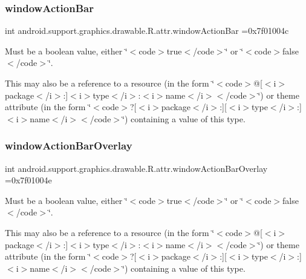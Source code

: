 \subsubsection{\texorpdfstring{window\+Action\+Bar}{windowActionBar}}
{\footnotesize\ttfamily int android.\+support.\+graphics.\+drawable.\+R.\+attr.\+window\+Action\+Bar =0x7f01004c\hspace{0.3cm}{\ttfamily [static]}}

Must be a boolean value, either \char`\"{}$<$code$>$true$<$/code$>$\char`\"{} or \char`\"{}$<$code$>$false$<$/code$>$\char`\"{}. 

This may also be a reference to a resource (in the form \char`\"{}$<$code$>$@\mbox{[}$<$i$>$package$<$/i$>$\+:\mbox{]}$<$i$>$type$<$/i$>$\+:$<$i$>$name$<$/i$>$$<$/code$>$\char`\"{}) or theme attribute (in the form \char`\"{}$<$code$>$?\mbox{[}$<$i$>$package$<$/i$>$\+:\mbox{]}\mbox{[}$<$i$>$type$<$/i$>$\+:\mbox{]}$<$i$>$name$<$/i$>$$<$/code$>$\char`\"{}) containing a value of this type. \mbox{\label{classandroid_1_1support_1_1graphics_1_1drawable_1_1R_1_1attr_ad7a0be15391a71f9e4bb290c66e13a4e}} 
\subsubsection{\texorpdfstring{window\+Action\+Bar\+Overlay}{windowActionBarOverlay}}
{\footnotesize\ttfamily int android.\+support.\+graphics.\+drawable.\+R.\+attr.\+window\+Action\+Bar\+Overlay =0x7f01004e\hspace{0.3cm}{\ttfamily [static]}}

Must be a boolean value, either \char`\"{}$<$code$>$true$<$/code$>$\char`\"{} or \char`\"{}$<$code$>$false$<$/code$>$\char`\"{}. 

This may also be a reference to a resource (in the form \char`\"{}$<$code$>$@\mbox{[}$<$i$>$package$<$/i$>$\+:\mbox{]}$<$i$>$type$<$/i$>$\+:$<$i$>$name$<$/i$>$$<$/code$>$\char`\"{}) or theme attribute (in the form \char`\"{}$<$code$>$?\mbox{[}$<$i$>$package$<$/i$>$\+:\mbox{]}\mbox{[}$<$i$>$type$<$/i$>$\+:\mbox{]}$<$i$>$name$<$/i$>$$<$/code$>$\char`\"{}) containing a value of this type. \mbox{\label{classandroid_1_1support_1_1graphics_1_1drawable_1_1R_1_1attr_a628f1008227259e1cdb40eee46de24db}} 
